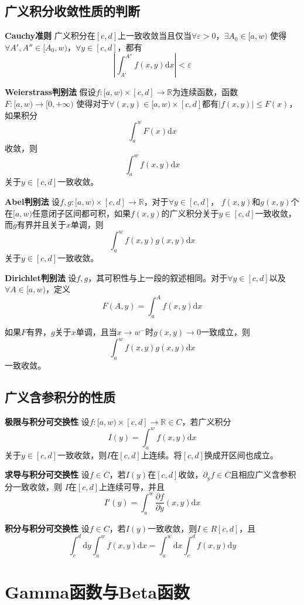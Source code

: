 \documentclass[UTF8,openany]{book}
\begin{document}
	\subsection{广义积分收敛性质的判断}
	\par\textbf{Cauchy准则}\quad
	广义积分在$[c,d]$上一致收敛当且仅当$\forall\varepsilon>0$，$\exists A_0\in[a,w)$
	使得$\forall A',A''\in[A_0,w)$，$\forall y\in[c,d]$，都有
	\[
	\left|\int_{A'}^{A''}f(x,y)\mathrm{d}x\right|<\varepsilon
	\]
	\par\textbf{Weierstrass判别法}\quad
	假设$f:[a,w)\times[c,d]\rightarrow\mathbb{R}$为连续函数，函数$F:[a,w)\rightarrow[0,+\infty)$
	使得对于$\forall(x,y)\in[a,w)\times[c,d]$都有$|f(x,y)|\leqslant F(x)$，如果积分
	\[
	\int_{a}^{w}F(x)\mathrm{d}x	
	\]
	收敛，则
	\[
	\int_{a}^{w}f(x,y)\mathrm{d}x	
	\]
	关于$y\in[c,d]$一致收敛。
	\par\textbf{Abel判别法}\quad
	设$f,g:[a,w)\times[c,d]\rightarrow\mathbb{R}$，对于$\forall y\in[c,d]$，
	$f(x,y)$和$g(x,y)$个在$[a,w)$任意闭子区间都可积，如果$f(x,y)$的广义积分关于$y\in[c,d]$一致收敛，
	而$g$有界并且关于$x$单调，则
	\[
	\int_a^wf(x,y)g(x,y)\mathrm{d}x	
	\]
	关于$y\in[c,d]$一致收敛。
	\par\textbf{Dirichlet判别法}\quad
	设$f,g$，其可积性与上一段的叙述相同。对于$\forall y\in[c,d]$以及
	$\forall A\in[a,w)$，定义
	\[
	F(A,y)=\int_{a}^{A}f(x,y)\mathrm{d}x	
	\]
	\par 如果$F$有界，$g$关于$x$单调，且当$x\rightarrow w^-$时$g(x,y)\rightarrow 0$一致成立，则
	\[
	\int_{a}^{w}f(x,y)g(x,y)\mathrm{d}x	
	\]
	一致收敛。
	\subsection{广义含参积分的性质}
	\par\textbf{极限与积分可交换性}\quad
	设$f:[a,w)\times[c,d]\rightarrow\mathbb{R}\in C$，若广义积分
	\[
	I(y)=\int_{a}^{w}f(x,y)\mathrm{d}x	
	\]关于$y\in[c,d]$一致收敛，则$I$在$[c,d]$上连续。将$[c,d]$换成开区间也成立。
	\par\textbf{求导与积分可交换性}\quad
	设$f\in C$，若$I(y)$在$[c,d]$收敛，$\partial_yf\in C$且相应广义含参积分一致收敛，则
	$I$在$[c,d]$上连续可导，并且
	\[
	I'(y)=\int_{a}^{w}\frac{\partial f}{\partial y}(x,y)\mathrm{d}x	
	\]
	\par\textbf{积分与积分可交换性}\quad
	设$f\in C$，若$I(y)$一致收敛，则$I\in R[c,d]$，且
	\[
	\int_{c}^{d}\mathrm{d}y\int_{a}^{w}f(x,y)\mathrm{d}x=\int_{a}^{w}\mathrm{d}x\int_{c}^{d}f(x,y)\mathrm{d}y	
	\]
	\section{Gamma函数与Beta函数}
\end{document}
